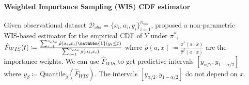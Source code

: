 \paragraph{Weighted Importance Sampling (WIS) CDF estimator} Given observational dataset $\mathcal{D}_{obs} = \{x_i, a_i, y_i\}_{i=1}^{n_{obs}}$, \cite{risk-assessment} proposed a non-parametric WIS-based estimator for the empirical CDF of $Y$ under $\pi^*$, 
$
\hat{F}_{WIS}(t) \coloneqq \frac{\sum_{i=1}^{n_{obs}} \hat{\rho}(a_i, x_i) \mathbbm{1}(y_i \leq t)}{\sum_{i=1}^{n_{obs}} \hat{\rho}(a_i, x_i)}
$
where $\hat{\rho}(a, x) \coloneqq \frac{\pi^*(a \mid x)}{\hat{\pi}^b(a \mid x)}$ are the importance weights. We can use $\hat{F}_{WIS}$ to get predictive intervals $[y_{\alpha/2}, y_{1-\alpha/2}]$ where $y_\beta \coloneqq \text{Quantile}_\beta(\hat{F}_{WIS})$. The intervals $[y_{\alpha/2}, y_{1-\alpha/2}]$ do not depend on $x$.




